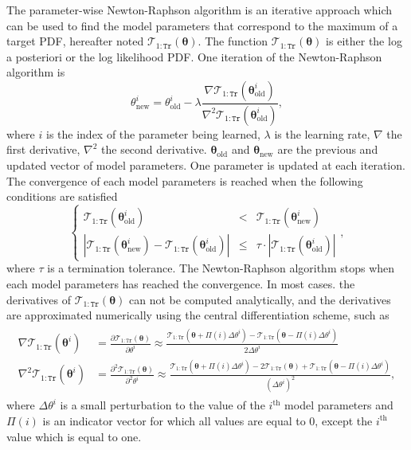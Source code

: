 The parameter-wise Newton-Raphson \cite{gelman2014bayesian} algorithm is an iterative approach which can be used to find the model parameters that correspond to the maximum of a target PDF, hereafter noted $\mathcal{T}_{1:\mathtt{Tr}}(\bm{\theta})$.
The function $\mathcal{T}_{1:\mathtt{Tr}}(\bm{\theta})$  is either the log a posteriori or the log likelihood PDF.
One iteration of the Newton-Raphson algorithm is
\begin{equation}
{\theta}_{\text{new}}^{i}  = {\theta}_{\text{old}}^{i} - \lambda \frac{\nabla \mathcal{T}_{1:\mathtt{Tr}}(\bm{\theta}_{\text{old}}^{i}) }{  \nabla^{2} \mathcal{T}_{1:\mathtt{Tr}}(\bm{\theta}_{\text{old}}^{i})},
\label{EQ:NR}
\end{equation}
where $i$ is the index of the parameter being learned, $\lambda$ is the learning rate, $\nabla$ the first derivative, $\nabla^{2}$ the second derivative.
$\bm{\theta}_{\text{old}}$ and $\bm{\theta}_{\text{new}}$ are the previous and updated vector of model parameters. 
One parameter is updated at each iteration.
The convergence of each model parameters is reached when the following conditions are satisfied
\begin{equation}
\left\{\begin{array}{ccc}
\mathcal{T}_{1:\mathtt{Tr}}(\bm\theta^{i}_{\text{old}}) &<&\mathcal{T}_{1:\mathtt{Tr}}(\bm\theta^{i}_{\text{new}})\\[4pt]
\left|\mathcal{T}_{1:\mathtt{Tr}}(\bm\theta^{i}_{\text{new}}) -  \mathcal{T}_{1:\mathtt{Tr}}(\bm\theta^{i}_{\text{old}})\right| &\leq& \tau \cdot \left|\mathcal{T}_{1:\mathtt{Tr}}(\bm\theta^{i}_{\text{old}})\right|
\end{array}\right.,
\label{EQ:STC}
\end{equation}
where $\tau$ is a termination tolerance.
The Newton-Raphson algorithm stops when each model parameters has reached the convergence.
In most cases. the derivatives of $\mathcal{T}_{1:\mathtt{Tr}}(\bm{\theta})$ can not be computed analytically, and the derivatives are approximated numerically using the central differentiation scheme, such as
\begin{gather}
\begin{aligned}
 \nabla \mathcal{T}_{1:\mathtt{Tr}}(\bm\theta^{i}) & = \frac{\partial \mathcal{T}_{1:\mathtt{Tr}} (\bm\theta) }{\partial \theta^{i}} \approx \frac{\mathcal{T}_{1:\mathtt{Tr}} (\bm\theta + \Pi(i)\Delta \theta^{i} )  -  \mathcal{T}_{1:\mathtt{Tr}} (\bm\theta - \Pi(i)\Delta \theta^{i} ) }{2\Delta \theta^{i}}  \\
 \nabla^{2} \mathcal{T}_{1:\mathtt{Tr}}(\bm\theta^{i}) & = \frac{\partial^{2} \mathcal{T}_{1:\mathtt{Tr}} (\bm\theta) }{\partial^{2} \theta^{i}} \approx \frac{\mathcal{T}_{1:\mathtt{Tr}} (\bm\theta + \Pi(i)\Delta \theta^{i} )  -  2 \mathcal{T}_{1:\mathtt{Tr}} (\bm\theta) +  \mathcal{T}_{1:\mathtt{Tr}} (\bm\theta - \Pi(i)\Delta \theta^{i} ) }{(\Delta \theta^{i})^{2}},
\label{EQ:numericaldiff}
\end{aligned}
\end{gather}
where $\Delta \theta^{i}$ is a small perturbation to the value of the $i^{\text{th}}$ model parameters and $\Pi(i)$ is an indicator vector for which all values are equal to $0$, except the $i^{\text{th}}$ value which is equal to one.

